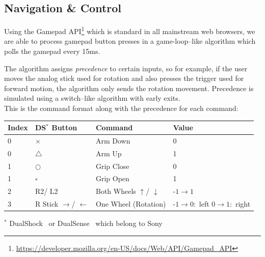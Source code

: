 \documentclass[a4paper,12pt]{article}
\newcommand{\sz}{\text{-}}
\begin{document}
\subsection{Navigation \& Control} \label{navcmd}

Using the Gamepad API\footnote{\url{https://developer.mozilla.org/en-US/docs/Web/API/Gamepad_API}} which is standard in all mainstream web browsers, we are able to process gamepad button presses in a game-loop--like algorithm which polls the gamepad every 15ms.

The algorithm assigns \textit{precedence} to certain inputs, so for example, if the user moves the analog stick used for rotation and also presses the trigger used for forward motion, the algorithm only sends the rotation movement. Precedence is simulated using a switch--like algorithm with early exits.\\
This is the command format along with the precedence for each command:
\begin{center}
    \bgroup
    \def\arraystretch{1.5}
    {
        \begin{tabular}{|l|l|l|p{6em}|}
            \hline
            \textbf{Index} & \textbf{DS$^*$ Button}              & \textbf{Command}                     & \textbf{Value}                                                \\
            \hline
            0              & $\times$                            & Arm Down                             & 0                                                             \\
            \hline
            0              & $\triangle$                         & Arm Up                               & 1                                                             \\
            \hline
            1              & $\bigcirc$                          & Grip Close                           & 0                                                             \\
            \hline
            1              & $\square$                           & Grip Open                            & 1                                                             \\
            \hline
            2              & R2/ L2                              & Both Wheels $\uparrow$/ $\downarrow$ & $\sz1 \rightarrow 1$                                          \\
            \hline
            3              & R Stick $\rightarrow$/ $\leftarrow$ & One Wheel (Rotation)                 & $\sz1 \rightarrow 0 :$ left \newline $0 \rightarrow 1:$ right \\
            \hline
        \end{tabular}}
    \egroup

    \footnotesize{$^*$ DualShock \textregistered\ or DualSense \textregistered\ which belong to Sony \texttrademark}\\
\end{center}
\end{document}
